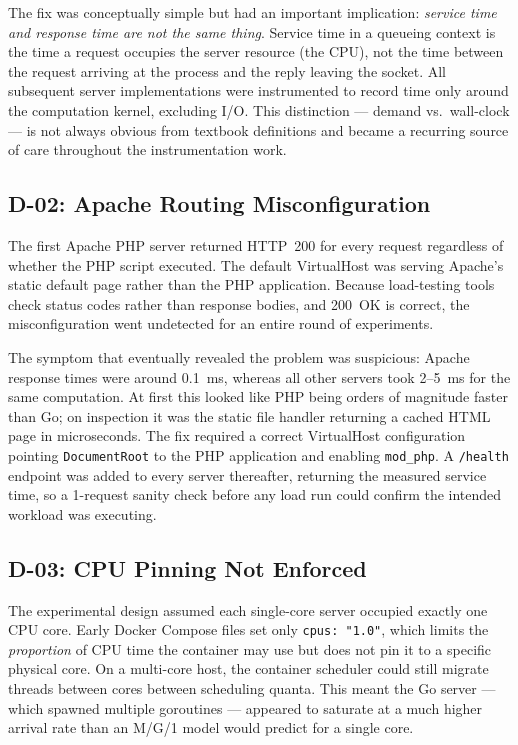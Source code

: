 The fix was conceptually simple but had an important implication: \emph{service time and response time are not the same thing}. Service time in a queueing context is the time a request occupies the server resource (the CPU), not the time between the request arriving at the process and the reply leaving the socket. All subsequent server implementations were instrumented to record time only around the computation kernel, excluding I/O. This distinction — demand vs.\ wall-clock — is not always obvious from textbook definitions and became a recurring source of care throughout the instrumentation work.

\subsection{D-02: Apache Routing Misconfiguration}

The first Apache PHP server returned HTTP~200 for every request regardless of whether the PHP script executed. The default VirtualHost was serving Apache's static default page rather than the PHP application. Because load-testing tools check status codes rather than response bodies, and 200~OK is correct, the misconfiguration went undetected for an entire round of experiments.

The symptom that eventually revealed the problem was suspicious: Apache response times were around 0.1~ms, whereas all other servers took 2--5~ms for the same computation. At first this looked like PHP being orders of magnitude faster than Go; on inspection it was the static file handler returning a cached HTML page in microseconds. The fix required a correct VirtualHost configuration pointing \texttt{DocumentRoot} to the PHP application and enabling \texttt{mod\_php}. A \texttt{/health} endpoint was added to every server thereafter, returning the measured service time, so a 1-request sanity check before any load run could confirm the intended workload was executing.

\subsection{D-03: CPU Pinning Not Enforced}

The experimental design assumed each single-core server occupied exactly one CPU core. Early Docker Compose files set only \texttt{cpus: "1.0"}, which limits the \emph{proportion} of CPU time the container may use but does not pin it to a specific physical core. On a multi-core host, the container scheduler could still migrate threads between cores between scheduling quanta. This meant the Go server — which spawned multiple goroutines — appeared to saturate at a much higher arrival rate than an M/G/1 model would predict for a single core.

